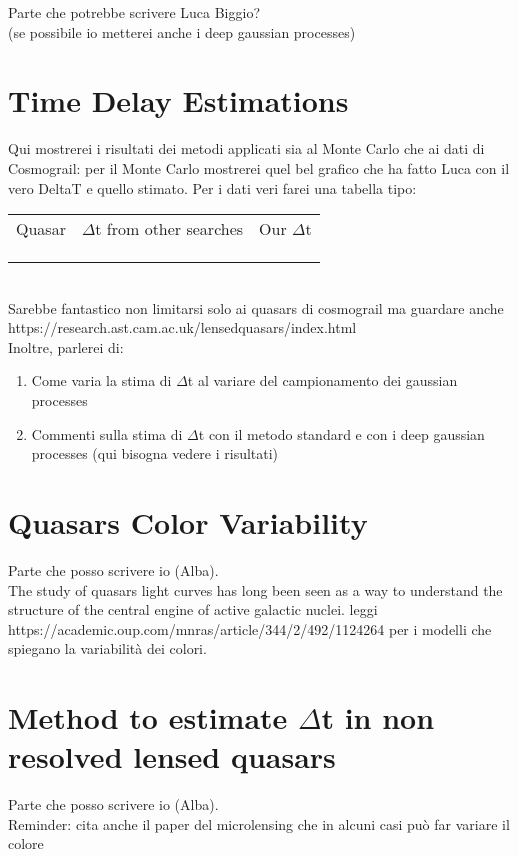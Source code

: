 \documentclass[twoside,twocolumn]{article}
\begin{document}
Parte che potrebbe scrivere Luca Biggio?
\\
(se possibile io metterei anche i deep gaussian processes)



\section{Time Delay Estimations}
 
 Qui mostrerei i risultati dei metodi applicati sia al Monte Carlo che ai dati di Cosmograil: per il Monte Carlo mostrerei quel bel grafico che ha fatto Luca con il vero DeltaT e quello stimato. Per i dati veri farei una tabella tipo:
 \begin{table}[h]
 	\begin{tabular}{c|c|c}
 	Quasar	& $\Delta$t from other searches &  Our $\Delta$t  \\
 		&  &    \\
 		&  &  \\
 		&  & 
 	\end{tabular}
 \end{table}
\\
Sarebbe fantastico non limitarsi solo ai quasars di cosmograil ma guardare anche https://research.ast.cam.ac.uk/lensedquasars/index.html
\\
Inoltre, parlerei di: 
\begin{enumerate}
	\item Come varia la stima di $\Delta$t al variare del campionamento dei gaussian processes
	\item Commenti sulla stima di $\Delta$t con il metodo standard e con i deep gaussian processes (qui bisogna vedere i risultati)
\end{enumerate} 


\section{Quasars Color Variability}
Parte che posso scrivere io (Alba).
\\
The study of quasars light curves has long been seen as a way to understand the structure of the central engine of active galactic nuclei.
leggi https://academic.oup.com/mnras/article/344/2/492/1124264 per i modelli che spiegano la variabilità dei colori.


\section{Method to estimate $\Delta$t in non resolved lensed quasars}
Parte che posso scrivere io (Alba).
\\
Reminder: cita anche il paper del microlensing che in alcuni casi può far variare il colore
\end{document}
